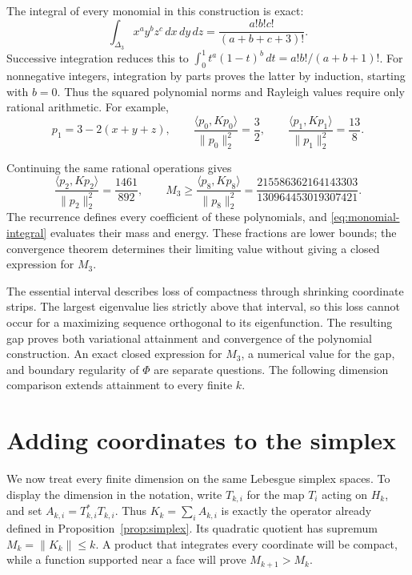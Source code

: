 \documentclass[11pt]{article}
\newcommand{\D}{\Delta}
\newcommand{\ip}[2]{\langle #1,#2\rangle}
\newcommand{\norm}[1]{\lVert #1\rVert}
\begin{document}
The integral of every monomial in this construction is exact:
\begin{equation}\label{eq:monomial-integral}
 \int_{\D_3}x^ay^bz^c\,dx\,dy\,dz
                      =\frac{a!b!c!}{(a+b+c+3)!}.
\end{equation}
Successive integration reduces this to
$\int_0^1t^a(1-t)^b\,dt=a!b!/(a+b+1)!$.
For nonnegative integers, integration by parts proves the latter by
induction, starting with $b=0$.
Thus the squared polynomial norms and Rayleigh values require only rational arithmetic.
For example,
\[
 p_1=3-2(x+y+z),\qquad
 \frac{\ip{p_0}{Kp_0}}{\norm{p_0}_2^2}=\frac32,
 \qquad
 \frac{\ip{p_1}{Kp_1}}{\norm{p_1}_2^2}=\frac{13}{8}.
\]

Continuing the same rational operations gives
\[
 \frac{\ip{p_2}{Kp_2}}{\norm{p_2}_2^2}=\frac{1461}{892},\qquad
 M_3\geq\frac{\ip{p_8}{Kp_8}}{\norm{p_8}_2^2}
       =\frac{215586362164143303}{130964453019307421}.
\]
The recurrence defines every coefficient of these polynomials, and
\eqref{eq:monomial-integral} evaluates their mass and energy.
These fractions are lower bounds; the convergence theorem determines their
limiting value without giving a closed expression for $M_3$.

The essential interval describes loss of compactness through shrinking
coordinate strips.  The largest eigenvalue lies strictly above that interval,
so this loss cannot occur for a maximizing sequence orthogonal to its
eigenfunction.  The resulting gap proves both variational attainment and
convergence of the polynomial construction.
An exact closed expression for $M_3$, a numerical value for the gap,
and boundary regularity of $\Phi$ are separate questions.
The following dimension comparison extends attainment to every finite $k$.


\section{Adding coordinates to the simplex}\label{all:section}

We now treat every finite dimension on the same Lebesgue simplex spaces.
To display the dimension in the notation, write $T_{k,i}$ for the map $T_i$
acting on $H_k$, and set $A_{k,i}=T_{k,i}^*T_{k,i}$.
Thus $K_k=\sum_iA_{k,i}$ is exactly the operator already defined in
Proposition~\ref{prop:simplex}.
Its quadratic quotient has supremum $M_k=\|K_k\|\leq k$.
A product that integrates every coordinate will be compact, while a
function supported near a face will prove $M_{k+1}>M_k$.
\end{document}
